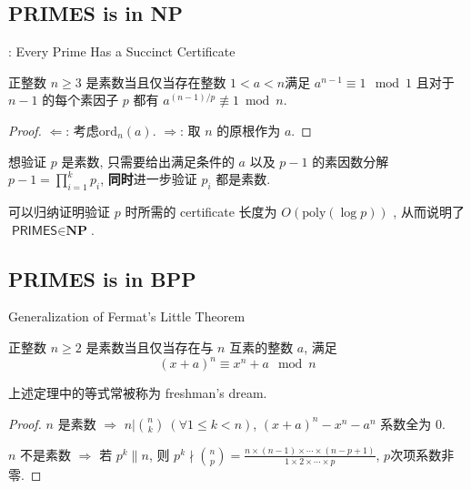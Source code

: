 \documentclass{beamer}
\def\le{\leqslant}
\def\ge{\geqslant}
\def\ord{\textrm{ord}}
\begin{document}
\subsection{PRIMES is in NP}
\begin{frame}{\cite{Pratt75}: Every Prime Has a Succinct Certificate}
	\begin{theorem}
		正整数 $n \ge 3$ 是素数当且仅当存在整数 $1 < a < n$满足 $a^{n-1} \equiv 1 \mod 1$ 且对于 $n-1$ 的每个素因子 $p$ 都有 $a^{(n-1)/p} \not\equiv 1 \bmod n$.
	\end{theorem}
	\begin{proof}
		$\Leftarrow$: 考虑$\ord_{n}(a)$. $\Rightarrow$: 取 $n$ 的原根作为 $a$.
	\end{proof}
	
	想验证 $p$ 是素数, 只需要给出满足条件的 $a$ 以及 $p - 1$ 的素因数分解 $p - 1 = \prod\limits_{i=1}^{k}p_i$, \textbf{同时}进一步验证 $p_i$ 都是素数.  

	可以归纳证明验证 $p$ 时所需的 certificate 长度为 $O(\textrm{poly}(\log p))$ , 从而说明了 $\textsf{PRIMES} \in \textbf{NP}$.	
	
\end{frame}

\subsection{PRIMES is in BPP}
\begin{frame}{Generalization of Fermat's Little Theorem}
	\begin{theorem}
		正整数 $n \ge 2$ 是素数当且仅当存在与 $n$ 互素的整数 $a$, 满足 $$(x + a)^n \equiv x^n + a \mod n$$
	\end{theorem}

	上述定理中的等式常被称为 freshman's dream.

	\begin{proof}
		$n$ 是素数 $\Rightarrow$ $n | \binom{n}{k} \ (\forall 1 \le k < n)$, $(x + a)^n - x^n - a^n$ 系数全为 $0$.

		$n$ 不是素数 $\Rightarrow$ 若 $p^k \| n$, 则 $p^k \nmid \binom{n}{p} = \frac{n \times (n-1) \times \cdots \times (n-p+1)}{1 \times 2 \times \cdots \times p}$, $p$次项系数非零.
	\end{proof}
	
\end{frame}
\end{document}
